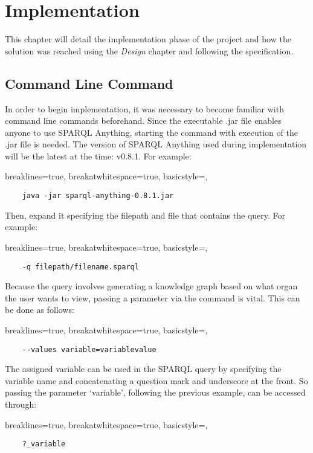  \chapter{Implementation}
This chapter will detail the implementation phase of the project and how the solution was reached using the \textit{Design} chapter and following the specification. 

\section{Command Line Command}
\hspace*{0.5cm} In order to begin implementation, it was necessary to become familiar with command line commands beforehand. Since the executable .jar file enables anyone to use SPARQL Anything, starting the command with execution of the .jar file is needed. The version of SPARQL Anything used during implementation will be the latest at the time: v0.8.1. For example:

\lstset
{
    breaklines=true,
    breakatwhitespace=true,
    basicstyle=\linespread{1.5}\ttfamily,
}
\begin{lstlisting}
    java -jar sparql-anything-0.8.1.jar 
\end{lstlisting}

\noindent Then, expand it specifying the filepath and file that contains the query. For example:

\lstset
{
    breaklines=true,
    breakatwhitespace=true,
    basicstyle=\linespread{1.5}\ttfamily,
}
\begin{lstlisting}
    -q filepath/filename.sparql
\end{lstlisting}

\noindent Because the query involves generating a knowledge graph based on what organ the user wants to view, passing a parameter via the command is vital. This can be done as follows:

\lstset
{
    breaklines=true,
    breakatwhitespace=true,
    basicstyle=\linespread{1.5}\ttfamily,
}
\begin{lstlisting}
    --values variable=variablevalue
\end{lstlisting}

\noindent The assigned variable can be used in the SPARQL query by specifying the variable name and concatenating a question mark and underscore at the front. So passing the parameter `variable', following the previous example, can be accessed through:

\lstset
{
    breaklines=true,
    breakatwhitespace=true,
    basicstyle=\linespread{1.5}\ttfamily,
}
\begin{lstlisting}
    ?_variable
\end{lstlisting}

